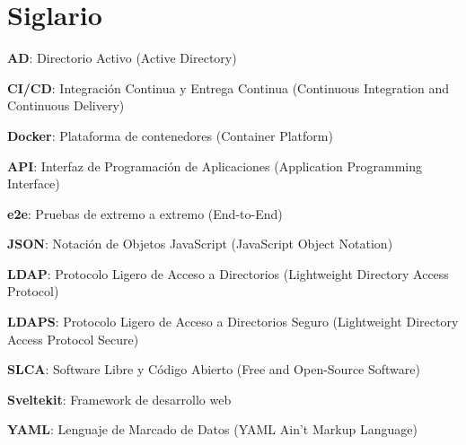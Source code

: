 \section{Siglario}

\textbf{AD}: Directorio Activo (Active Directory)

\textbf{CI/CD}: Integración Continua y Entrega Continua (Continuous Integration and Continuous Delivery)

\textbf{Docker}: Plataforma de contenedores (Container Platform)

\textbf{API}: Interfaz de Programación de Aplicaciones (Application Programming Interface)

\textbf{e2e}: Pruebas de extremo a extremo (End-to-End)

\textbf{JSON}: Notación de Objetos JavaScript (JavaScript Object Notation)

\textbf{LDAP}: Protocolo Ligero de Acceso a Directorios (Lightweight Directory Access Protocol)

\textbf{LDAPS}: Protocolo Ligero de Acceso a Directorios Seguro (Lightweight Directory Access Protocol Secure)

\textbf{SLCA}: Software Libre y Código Abierto (Free and Open-Source Software)

\textbf{Sveltekit}: Framework de desarrollo web

\textbf{YAML}: Lenguaje de Marcado de Datos (YAML Ain't Markup Language)
